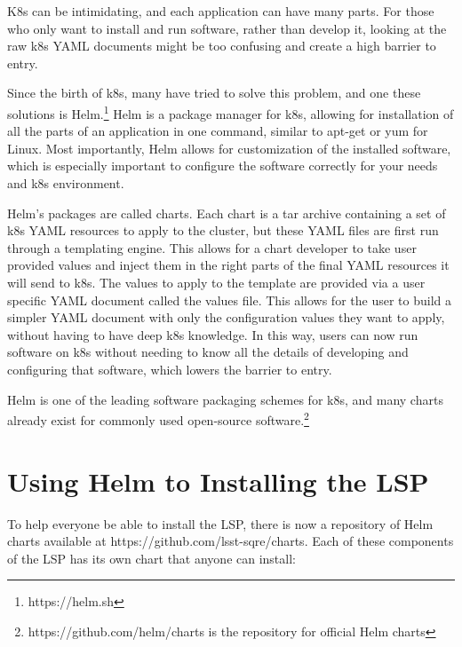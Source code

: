 \documentclass[11pt,twoside]{article}
\begin{document}
K8s can be intimidating, and each application can have many parts.  For those who only
want to install and run software, rather than develop it, looking at the raw
k8s YAML documents might be too confusing and create a high barrier to entry.

Since the birth of k8s, many have tried to solve this problem, and one these
solutions is Helm.\footnote{https://helm.sh}  Helm is a package manager for k8s, allowing
for installation of all the parts of an application in one command, similar to apt-get
or yum for Linux.
Most importantly, Helm allows for customization of the installed software, which is
especially important to configure the software correctly for your needs and k8s environment.

Helm's packages are called charts.  Each chart is a tar archive containing a set of
k8s YAML resources to apply to the cluster, but these YAML files are first run through
a templating engine.  This allows for a chart developer to take user provided values
and inject them in the right parts of the final YAML resources it will send to k8s.
The values to apply to the template are provided via a user specific YAML document
called the values file.
This allows for the user to build a simpler YAML document with only the configuration
values they want to apply, without having to have deep k8s knowledge.  In this way,
users can now run software on k8s without needing to know all the details of developing
and configuring that software, which lowers the barrier to entry.

Helm is one of the leading software packaging schemes for k8s, and many charts
already exist for commonly used open-source software.\footnote{https://github.com/helm/charts
is the repository for official Helm charts}

\section{Using Helm to Installing the LSP}

To help everyone be able to install the LSP, there is now a repository of Helm
charts available at https://github.com/lsst-sqre/charts.  Each of these components
of the LSP has its own chart that anyone can install:
\end{document}
